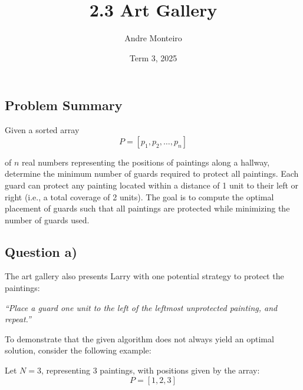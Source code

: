 \documentclass[12pt]{article}
\title{2.3 Art Gallery}
\author{Andre Monteiro}
\date{Term 3, 2025}
\begin{document}
\maketitle
\newpage
\subsection*{Problem Summary}
Given a sorted array
\[
P = [p_1, p_2,\ldots, p_n]
\]

of $n$ real numbers representing the positions of paintings along a hallway, determine the minimum number of guards required to protect all paintings. Each guard can protect any painting located within a distance of 1 unit to their left or right (i.e., a total coverage of 2 units). The goal is to compute the optimal placement of guards such that all paintings are protected while minimizing the number of guards used.
\begin{center}
\end{center}
\newpage
\subsection*{Question a)}
The art gallery also presents Larry with one potential strategy to protect the paintings:
\begin{center}
\textit{``Place a guard one unit to the left of the leftmost unprotected painting, and repeat.''}
\end{center}

To demonstrate that the given algorithm does not always yield an optimal solution, consider the following example:

Let \( N = 3 \), representing 3 paintings, with positions given by the array:
\[
P = [1, 2, 3]
\]
\end{document}
